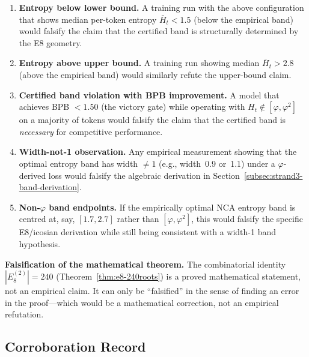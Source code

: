 \begin{enumerate}[label=\textbf{F\arabic*.}]
  \item \textbf{Entropy below lower bound.}  A training run with the
    above configuration that shows median per-token entropy
    \(\bar{H}_t < 1.5\) (below the empirical band) would falsify
    the claim that the certified band is structurally determined
    by the E8 geometry.
  \item \textbf{Entropy above upper bound.}  A training run showing
    median \(\bar{H}_t > 2.8\) (above the empirical band) would
    similarly refute the upper-bound claim.
  \item \textbf{Certified band violation with BPB improvement.}  A
    model that achieves BPB $< 1.50$ (the victory gate) while
    operating with \(H_t \notin [\varphi, \varphi^2]\) on a
    majority of tokens would falsify the claim that the certified
    band is \emph{necessary} for competitive performance.
  \item \textbf{Width-not-1 observation.}  Any empirical measurement
    showing that the optimal entropy band has width $\neq 1$ (e.g.,
    width~0.9 or~1.1) under a \(\varphi\)-derived loss would
    falsify the algebraic derivation in
    Section~\ref{subsec:strand3-band-derivation}.
  \item \textbf{Non-\(\varphi\) band endpoints.}  If the empirically
    optimal NCA entropy band is centred at, say,
    \([1.7, 2.7]\) rather than \([\varphi, \varphi^2]\), this
    would falsify the specific E8/icosian derivation while still
    being consistent with a width-1 band hypothesis.
\end{enumerate}

\medskip
\noindent
\textbf{Falsification of the mathematical theorem.}  The
combinatorial identity \(|E_8^{(2)}| = 240\) (Theorem~\ref{thm:e8-240roots})
is a proved mathematical statement, not an empirical claim.  It can
only be ``falsified'' in the sense of finding an error in the
proof—which would be a mathematical correction, not an empirical
refutation.

\subsection{Corroboration Record}
\label{subsec:falsify-corroboration}

